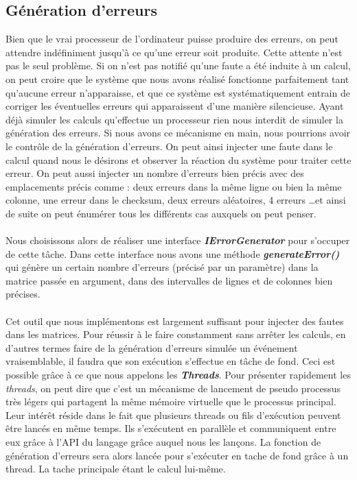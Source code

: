 \documentclass[a4paper, 10pt]{report}
\begin{document}
\subsection{Génération d'erreurs}
Bien que le vrai processeur de l’ordinateur puisse produire des erreurs, on peut attendre indéfiniment jusqu'à ce 
qu’une erreur soit produite. Cette attente n’est pas le seul problème. Si on n’est pas notifié qu’une faute a été 
induite à un calcul, on peut croire que le système que nous avons réalisé fonctionne parfaitement tant qu’aucune 
erreur n’apparaisse, et que ce système est systématiquement entrain de corriger les éventuelles erreurs qui apparaissent 
d’une manière silencieuse. Ayant déjà simuler les calculs qu’effectue un processeur rien nous interdit de simuler la 
génération des erreurs. Si nous avons ce mécanisme en main, nous pourrions avoir le contrôle de la génération d’erreurs. 
On peut ainsi injecter une faute dans le calcul quand nous le désirons et observer la réaction du système pour traiter 
cette erreur. On peut aussi injecter un nombre d’erreurs bien précis avec des emplacements précis comme : deux erreurs 
dans la même ligne ou bien la même colonne, une erreur dans le checksum, deux erreurs aléatoires, 4 erreurs \ldots et ainsi 
de suite on peut énumérer tous les différents cas auxquels on peut penser.
\paragraph*{}
Nous choisissons alors de réaliser une interface \textbf{\textit{IErrorGenerator}} pour s’occuper de cette tâche. 
Dans cette interface nous avons une méthode \textbf{\textit{generateError()}} qui génère un certain nombre d’erreurs 
(précisé par un paramètre) dans la matrice passée en argument, dans des intervalles de lignes et de colonnes bien précises.
\paragraph*{}
Cet outil que nous implémentons est largement suffisant pour injecter des fautes dans les matrices. Pour réussir à le 
faire constamment sans arrêter les calculs, en d’autres termes faire de la génération d’erreurs simulée un événement 
vraisemblable, il faudra que son exécution s’effectue en tâche de fond.
\newline
Ceci est possible grâce à ce que nous appelons les \textbf{\textit{Threads}}. Pour présenter rapidement les \textit{threads}, 
on peut dire que c’est un mécanisme de lancement de pseudo processus très légers qui partagent la même mémoire virtuelle que 
le processus principal. Leur intérêt réside dans le fait que plusieurs threads ou fils d’exécution peuvent être lancés en 
même temps. Ils s’exécutent en parallèle et communiquent entre eux grâce à l’API du langage grâce auquel nous les lançons.
La fonction de génération d’erreurs sera alors lancée pour s’exécuter en tache de fond grâce à un thread. La tache principale 
étant le calcul lui-même.
\end{document}

